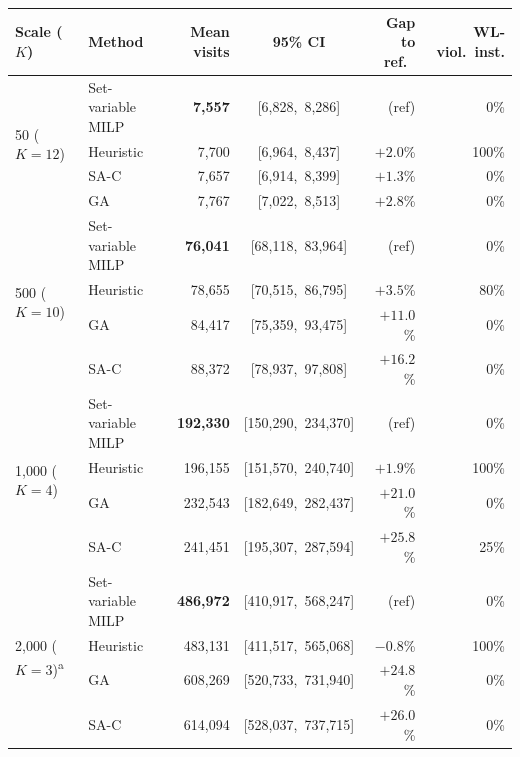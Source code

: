 \documentclass[]{interact}
\begin{document}
\begin{table}[t]
\centering
{}
{\small\begin{tabular}{@{}llrcrr@{}}
\toprule
Scale ($K$) & Method & Mean visits & 95\% CI & Gap to ref.\ & WL-viol.\ inst. \\
\midrule
\multirow{4}{*}{50 ($K{=}12$)}
 & Set-variable MILP & \textbf{7{,}557} & [6{,}828,\ 8{,}286] & (ref) & 0\% \\
 & Heuristic & 7{,}700 & [6{,}964,\ 8{,}437] & $+2.0$\% & 100\% \\
 & SA-C & 7{,}657 & [6{,}914,\ 8{,}399] & $+1.3$\% & 0\% \\
 & GA & 7{,}767 & [7{,}022,\ 8{,}513] & $+2.8$\% & 0\% \\
\midrule
\multirow{4}{*}{500 ($K{=}10$)}
 & Set-variable MILP & \textbf{76{,}041} & [68{,}118,\ 83{,}964] & (ref) & 0\% \\
 & Heuristic & 78{,}655 & [70{,}515,\ 86{,}795] & $+3.5$\% & 80\% \\
 & GA & 84{,}417 & [75{,}359,\ 93{,}475] & $+11.0$\% & 0\% \\
 & SA-C & 88{,}372 & [78{,}937,\ 97{,}808] & $+16.2$\% & 0\% \\
\midrule
\multirow{4}{*}{1{,}000 ($K{=}4$)}
 & Set-variable MILP & \textbf{192{,}330} & [150{,}290,\ 234{,}370] & (ref) & 0\% \\
 & Heuristic & 196{,}155 & [151{,}570,\ 240{,}740] & $+1.9$\% & 100\% \\
 & GA & 232{,}543 & [182{,}649,\ 282{,}437] & $+21.0$\% & 0\% \\
 & SA-C & 241{,}451 & [195{,}307,\ 287{,}594] & $+25.8$\% & 25\% \\
\midrule
\multirow{4}{*}{2{,}000 ($K{=}3$)\textsuperscript{a}}
 & Set-variable MILP & \textbf{486{,}972} & [410{,}917,\ 568{,}247] & (ref) & 0\% \\
 & Heuristic & 483{,}131 & [411{,}517,\ 565{,}068] & $-0.8$\% & 100\% \\
 & GA & 608{,}269 & [520{,}733,\ 731{,}940] & $+24.8$\% & 0\% \\
 & SA-C & 614{,}094 & [528{,}037,\ 737{,}715] & $+26.0$\% & 0\% \\
\bottomrule
\end{tabular}}
\label{tab:reliability}
\end{table}
\end{document}
